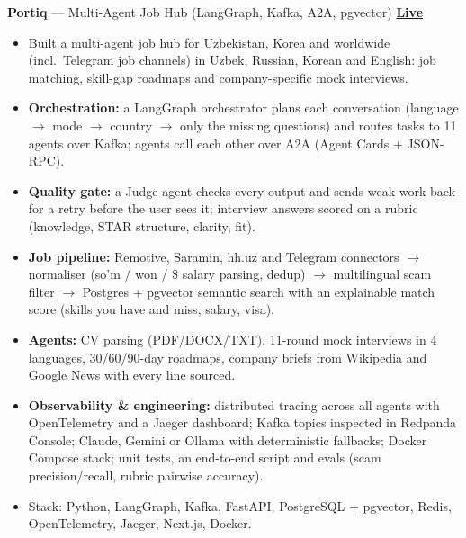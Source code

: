 \documentclass[11pt,a4paper]{article}
\begin{document}
\textbf{Portiq} --- Multi-Agent Job Hub (LangGraph, Kafka, A2A, pgvector) \hfill {\large\textbf{\href{https://portiq-gamma.vercel.app}{Live}}}
\begin{itemize}
    \item Built a multi-agent job hub for Uzbekistan, Korea and worldwide (incl.\ Telegram job channels) in Uzbek,
Russian, Korean and English: job matching, skill-gap roadmaps and company-specific mock interviews.
    \item \textbf{Orchestration:} a LangGraph orchestrator plans each conversation (language $\rightarrow$ mode $\rightarrow$
country $\rightarrow$ only the missing questions) and routes tasks to 11 agents over Kafka; agents call each other over
A2A (Agent Cards + JSON-RPC).
    \item \textbf{Quality gate:} a Judge agent checks every output and sends weak work back for a retry before the user sees it;
interview answers scored on a rubric (knowledge, STAR structure, clarity, fit).
    \item \textbf{Job pipeline:} Remotive, Saramin, hh.uz and Telegram connectors $\rightarrow$ normaliser (so'm / won / \$
salary parsing, dedup) $\rightarrow$ multilingual scam filter $\rightarrow$ Postgres + pgvector semantic search with an
explainable match score (skills you have and miss, salary, visa).
    \item \textbf{Agents:} CV parsing (PDF/DOCX/TXT), 11-round mock interviews in 4 languages, 30/60/90-day roadmaps,
company briefs from Wikipedia and Google News with every line sourced.
    \item \textbf{Observability \& engineering:} distributed tracing across all agents with OpenTelemetry and a Jaeger dashboard;
Kafka topics inspected in Redpanda Console; Claude, Gemini or Ollama with deterministic fallbacks; Docker Compose stack;
unit tests, an end-to-end script and evals (scam precision/recall, rubric pairwise accuracy).
    \item Stack: Python, LangGraph, Kafka, FastAPI, PostgreSQL + pgvector, Redis, OpenTelemetry, Jaeger, Next.js, Docker.
\end{itemize}

\medskip
\end{document}
